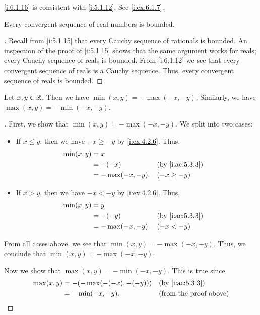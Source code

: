 \begin{note}
  \cref{i:6.1.16} is consistent with \cref{i:5.1.12}.
  See \cref{i:ex:6.1.7}.
\end{note}

\begin{cor}\label{i:6.1.17}
  Every convergent sequence of real numbers is bounded.
\end{cor}

\begin{proof}[]
  Recall from \cref{i:5.1.15} that every Cauchy sequence of rationals is bounded.
  An inspection of the proof of \cref{i:5.1.15} shows that the same argument works for reals;
  every Cauchy sequence of reals is bounded.
  From \cref{i:6.1.12} we see that every convergent sequence of reals is a Cauchy sequence.
  Thus, every convergent sequence of reals is bounded.
\end{proof}

\begin{ac}\label{i:ac:6.1.1}
  Let \(x, y \in \mathbb{R}\).
  Then we have \(\min(x, y) = -\max(-x, -y)\).
  Similarly, we have \(\max(x, y) = -\min(-x, -y)\).
\end{ac}

\begin{proof}[]
  First, we show that \(\min(x, y) = -\max(-x, -y)\).
  We split into two cases:
  \begin{itemize}
    \item If \(x \leq y\), then we have \(-x \geq -y\) by \cref{i:ex:4.2.6}.
          Thus,
          \begin{align*}
            \min(x, y) & = x                                   \\
                       & = -(-x)          &  & \by{i:ac:5.3.3} \\
                       & = -\max(-x, -y). &  & (-x \geq -y)
          \end{align*}
    \item If \(x > y\), then we have \(-x < -y\) by \cref{i:ex:4.2.6}.
          Thus,
          \begin{align*}
            \min(x, y) & = y                                   \\
                       & = -(-y)          &  & \by{i:ac:5.3.3} \\
                       & = -\max(-x, -y). &  & (-x < -y)
          \end{align*}
  \end{itemize}
  From all cases above, we see that \(\min(x, y) = -\max(-x, -y)\).
  Thus, we conclude that \(\min(x, y) = -\max(-x, -y)\).

  Now we show that \(\max(x, y) = -\min(-x, -y)\).
  This is true since
  \begin{align*}
    \max(x, y) & = -(-\max(-(-x), -(-y))) &  & \by{i:ac:5.3.3}               \\
               & = -\min(-x, -y).         &  & \text{(from the proof above)}
  \end{align*}
\end{proof}


